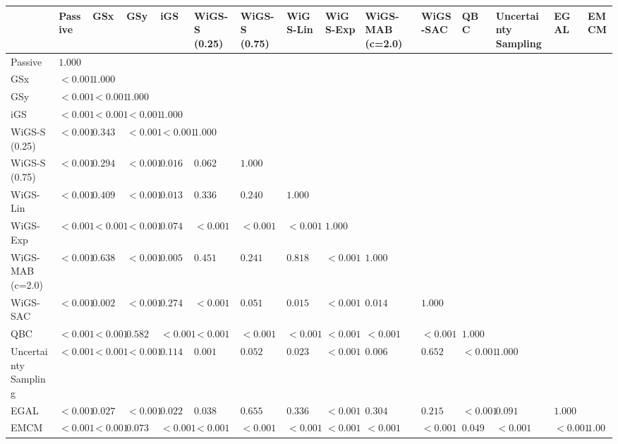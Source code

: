 \begin{tabular}{lllllllllllllll}
\toprule
 & Passive & GSx & GSy & iGS & WiGS-S (0.25) & WiGS-S (0.75) & WiGS-Lin & WiGS-Exp & WiGS-MAB (c=2.0) & WiGS-SAC & QBC & Uncertainty Sampling & EGAL & EMCM \\
\midrule
Passive & $1.000$ &  &  &  &  &  &  &  &  &  &  &  &  &  \\
GSx & $<0.001$ & $1.000$ &  &  &  &  &  &  &  &  &  &  &  &  \\
GSy & $<0.001$ & $<0.001$ & $1.000$ &  &  &  &  &  &  &  &  &  &  &  \\
iGS & $<0.001$ & $<0.001$ & $<0.001$ & $1.000$ &  &  &  &  &  &  &  &  &  &  \\
WiGS-S (0.25) & $<0.001$ & $0.343$ & $<0.001$ & $<0.001$ & $1.000$ &  &  &  &  &  &  &  &  &  \\
WiGS-S (0.75) & $<0.001$ & $0.294$ & $<0.001$ & $0.016$ & $0.062$ & $1.000$ &  &  &  &  &  &  &  &  \\
WiGS-Lin & $<0.001$ & $0.409$ & $<0.001$ & $0.013$ & $0.336$ & $0.240$ & $1.000$ &  &  &  &  &  &  &  \\
WiGS-Exp & $<0.001$ & $<0.001$ & $<0.001$ & $0.074$ & $<0.001$ & $<0.001$ & $<0.001$ & $1.000$ &  &  &  &  &  &  \\
WiGS-MAB (c=2.0) & $<0.001$ & $0.638$ & $<0.001$ & $0.005$ & $0.451$ & $0.241$ & $0.818$ & $<0.001$ & $1.000$ &  &  &  &  &  \\
WiGS-SAC & $<0.001$ & $0.002$ & $<0.001$ & $0.274$ & $<0.001$ & $0.051$ & $0.015$ & $<0.001$ & $0.014$ & $1.000$ &  &  &  &  \\
QBC & $<0.001$ & $<0.001$ & $0.582$ & $<0.001$ & $<0.001$ & $<0.001$ & $<0.001$ & $<0.001$ & $<0.001$ & $<0.001$ & $1.000$ &  &  &  \\
Uncertainty Sampling & $<0.001$ & $<0.001$ & $<0.001$ & $0.114$ & $0.001$ & $0.052$ & $0.023$ & $<0.001$ & $0.006$ & $0.652$ & $<0.001$ & $1.000$ &  &  \\
EGAL & $<0.001$ & $0.027$ & $<0.001$ & $0.022$ & $0.038$ & $0.655$ & $0.336$ & $<0.001$ & $0.304$ & $0.215$ & $<0.001$ & $0.091$ & $1.000$ &  \\
EMCM & $<0.001$ & $<0.001$ & $0.073$ & $<0.001$ & $<0.001$ & $<0.001$ & $<0.001$ & $<0.001$ & $<0.001$ & $<0.001$ & $0.049$ & $<0.001$ & $<0.001$ & $1.000$ \\
\bottomrule
\end{tabular}

